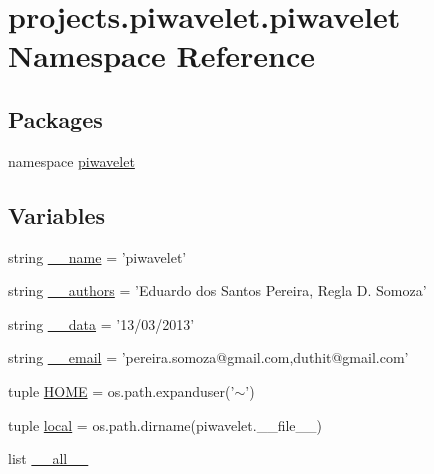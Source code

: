 \hypertarget{namespaceprojects_1_1piwavelet_1_1piwavelet}{\section{projects.\-piwavelet.\-piwavelet Namespace Reference}
\label{namespaceprojects_1_1piwavelet_1_1piwavelet}
}
\subsection*{Packages}
\begin{DoxyCompactItemize}
\item 
namespace \hyperlink{namespaceprojects_1_1piwavelet_1_1piwavelet_1_1piwavelet}{piwavelet}
\end{DoxyCompactItemize}
\subsection*{Variables}
\begin{DoxyCompactItemize}
\item 
string \hyperlink{namespaceprojects_1_1piwavelet_1_1piwavelet_ae450eb719290a337821e0182e30a6743}{\-\_\-\-\_\-name} = 'piwavelet'
\item 
string \hyperlink{namespaceprojects_1_1piwavelet_1_1piwavelet_ad6716b4588ff6cee6f330cfc1aed3be3}{\-\_\-\-\_\-authors} = 'Eduardo dos Santos Pereira, Regla D. Somoza'
\item 
string \hyperlink{namespaceprojects_1_1piwavelet_1_1piwavelet_a4dd414432887a7b3fbe0d3f852f0bed6}{\-\_\-\-\_\-data} = '13/03/2013'
\item 
string \hyperlink{namespaceprojects_1_1piwavelet_1_1piwavelet_a9048674aaf11471020664488adbb2702}{\-\_\-\-\_\-email} = 'pereira.\-somoza@gmail.\-com,duthit@gmail.\-com'
\item 
tuple \hyperlink{namespaceprojects_1_1piwavelet_1_1piwavelet_a0edeeca594c8a35263ae0f59cf21ca66}{H\-O\-M\-E} = os.\-path.\-expanduser('$\sim$')
\item 
tuple \hyperlink{namespaceprojects_1_1piwavelet_1_1piwavelet_ad2547c151ca38fa9f61fcbf62662785a}{local} = os.\-path.\-dirname(piwavelet.\-\_\-\-\_\-file\-\_\-\-\_\-)
\item 
list \hyperlink{namespaceprojects_1_1piwavelet_1_1piwavelet_a11313eac556397e6f118674cb99f1822}{\-\_\-\-\_\-all\-\_\-\-\_\-}
\end{DoxyCompactItemize}


